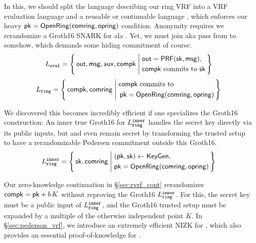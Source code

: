In this, we should split the language describing our ring VRF into
a VRF evaluation language \Leval and a reusable or continuable language
\Lring, which enforces our heavy $\mathsf{pk} = {\mathsf{OpenRing}}(\mathsf{comring},\mathsf{opring})$
condition.  Anonymity requires we rerandomize a Groth16 SNARK for \Lring
ala \cite[Theorem 3, Appendix C, pp. 31]{RandomizationGroth16}.
%
Yet, we must join aka pass \pk from \Lring to \Leval somehow, which
demands some hiding commitment \compk of course.
%
\def\tmpAA{\Out = \PRF(\sk,\msg)}%
\def\tmpBB{\textrm{\compk commits to\ \sk}}%
$$ \Leval = \Setst{ \Out, \msg, \aux, \compk }{
	\eprint{
	\tmpAA, \, \tmpBB
    }{
	\begin{aligned}
	&\tmpAA, \\
	&\tmpBB \\
	\end{aligned}
    }
} $$
\def\tmpAA{\textrm{\compk commits to\ }}%
\def\tmpBB{\OpenRing(\comring,\openring)}%
$$ \Lring = \Setst{ \compk, \comring }{
	\eprint{
	\tmpAA \pk = \tmpBB
	}{
    \begin{aligned}
	&\tmpAA \\
	&\, \pk = \tmpBB \\
    \end{aligned}
	}
} $$

We discovered this becomes incredibly efficient if one specializes
the Groth16 construction:  An inner true Groth16 for $L_{\mathtt{ring}}^{\mathtt{inner}}$
handles the secret key \sk directly via its public inputs, but
\sk and even \pk remain secret by transforming the trusted setup to have
a rerandomizable Pedersen commitment \compk outside this Groth16.
$$ \Lring^\inner = \Setst{ \sk, \comring}{
    \eprint{
    (\pk,\sk) \leftarrow \KeyGen, \, %
    \pk = \OpenRing(\comring,\openring) 
    }{
    \begin{aligned}
        &(\pk,\sk) \leftarrow \KeyGen, \\
        &\pk = \OpenRing(\comring,\openring)  \\      
    \end{aligned}
    }
} $$

Our zero-knowledge continuation in \S\ref{sec:rvrf_cont} rerandomizes
$\mathsf{compk} = \mathsf{pk} + b \, K$ without reproving the Groth16 $L_{\mathtt{ring}}^{\mathtt{inner}}$.
For this, the secret key \sk must be a public input of $L_{\mathtt{ring}}^{\mathtt{inner}}$, and
the Groth16 trusted setup must be expanded by a multiple of
 the otherwise independent point $K$.
%
In \S\ref{sec:pederson_vrf}, we introduce an extremely efficient NIZK
for \Leval, which also provides an essential proof-of-knowledge for \compk.


